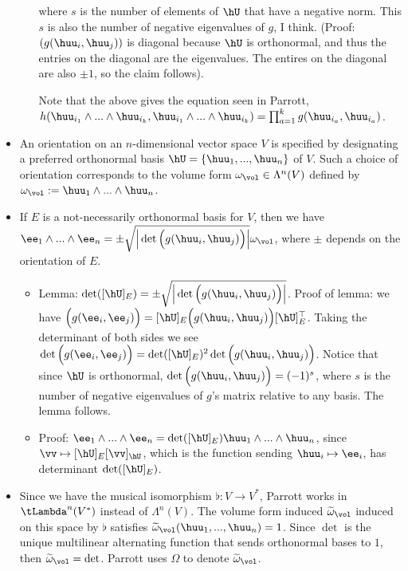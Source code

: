 \begin{itemize}
\begin{itemize}
		where $s$ is the number of elements of $\hU$ that have a negative norm. This $s$ is also the number of negative eigenvalues of $g$, I think. (Proof: $(g(\huu_i, \huu_j))$ is diagonal because $\hU$ is orthonormal, and thus the entries on the diagonal are the eigenvalues. The entires on the diagonal are also $\pm 1$, so the claim follows).
		
		Note that the above gives the equation seen in Parrott, $h(\huu_{i_1} \wedge ... \wedge \huu_{i_k}, \huu_{i_1} \wedge ... \wedge \huu_{i_k}) = \prod_{a = 1}^k g(\huu_{i_a}, \huu_{i_a})$.
	\end{itemize}
	
	\item An orientation on an $n$-dimensional vector space $V$ is specified by designating a preferred orthonormal basis $\hU = \{\huu_1, ..., \huu_n\}$ of $V$. Such a choice of orientation corresponds to the volume form $\omega_\vol \in \Lambda^n(V)$ defined by $\omega_\vol := \huu_1 \wedge ... \wedge \huu_n$.
	
	\item If $E$ is a not-necessarily orthonormal basis for $V$, then we have $\ee_1 \wedge ... \wedge \ee_n = \pm \sqrt{\Big| \det \Big( g(\huu_i, \huu_j) \Big) \Big|} \omega_\vol$, where $\pm$ depends on the orientation of $E$.
	\begin{itemize}
		\item Lemma: $\det([\hU]_E) = \pm \sqrt{ \Big| \det \Big( g(\huu_i, \huu_j) \Big) \Big|}$. Proof of lemma: we have $\Big( g(\ee_i, \ee_j) \Big) = [\hU]_E \Big( g(\huu_i, \huu_j) \Big) [\hU]_E^\top$. Taking the determinant of both sides we see $\det\Big( g(\ee_i, \ee_j) \Big) = \det([\hU]_E)^2 \det \Big(g(\huu_i, \huu_j) \Big)$. Notice that since $\hU$ is orthonormal, $\det \Big(g(\huu_i, \huu_j) \Big) = (-1)^s$, where $s$ is the number of negative eigenvalues of $g$'s matrix relative to any basis. The lemma follows.
		\item Proof: $\ee_1 \wedge ... \wedge \ee_n = \det([\hU]_E) \huu_1 \wedge ... \wedge \huu_n$, since $\vv \mapsto [\hU]_E [\vv]_\hU$, which is the function sending $\huu_i \mapsto \ee_i$, has determinant $\det([\hU]_E)$.
	\end{itemize}
	
	\item Since we have the musical isomorphism $\flat:V \rightarrow V^*$, Parrott works in $\tLambda^n(V^*)$ instead of $\Lambda^n(V)$. The volume form induced $\widetilde{\omega}_\vol$ induced on this space by $\flat$ satisfies $\widetilde{\omega}_\vol(\huu_1, ..., \huu_n) = 1$. Since $\det$ is the unique multilinear alternating function that sends orthonormal bases to $1$, then $\widetilde{\omega}_\vol = \det$. Parrott uses $\Omega$ to denote $\widetilde{\omega}_\vol$.
	

\end{itemize}
